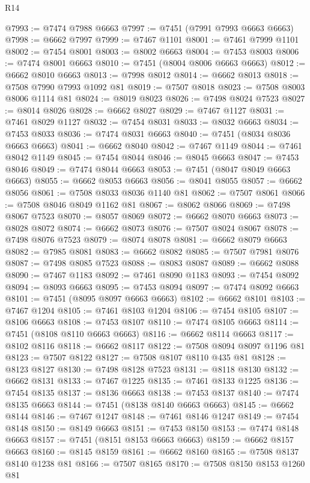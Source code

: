 \begin{lexlean}{R14}
\begin{coremodule}
@7993 := @7474 @7988 @6663
@7997 := @7451 (@7991 @7993 @6663 @6663)
@7998 := @6662 @7997
@7999 := @7467 @1101
@8001 := @7461 @7999 @1101
@8002 := @7454 @8001
@8003 := @8002 @6663
@8004 := @7453 @8003
@8006 := @7474 @8001 @6663
@8010 := @7451 (@8004 @8006 @6663 @6663)
@8012 := @6662 @8010 @6663
@8013 := @7998 @8012
@8014 := @6662 @8013
@8018 := @7508 @7990 @7993 @1092 @81
@8019 := @7507 @8018
@8023 := @7508 @8003 @8006 @1114 @81
@8024 := @8019 @8023
@8026 := @7498 @8024 @7523
@8027 := @8014 @8026
@8028 := @6662 @8027
@8029 := @7467 @1127
@8031 := @7461 @8029 @1127
@8032 := @7454 @8031
@8033 := @8032 @6663
@8034 := @7453 @8033
@8036 := @7474 @8031 @6663
@8040 := @7451 (@8034 @8036 @6663 @6663)
@8041 := @6662 @8040
@8042 := @7467 @1149
@8044 := @7461 @8042 @1149
@8045 := @7454 @8044
@8046 := @8045 @6663
@8047 := @7453 @8046
@8049 := @7474 @8044 @6663
@8053 := @7451 (@8047 @8049 @6663 @6663)
@8055 := @6662 @8053 @6663
@8056 := @8041 @8055
@8057 := @6662 @8056
@8061 := @7508 @8033 @8036 @1140 @81
@8062 := @7507 @8061
@8066 := @7508 @8046 @8049 @1162 @81
@8067 := @8062 @8066
@8069 := @7498 @8067 @7523
@8070 := @8057 @8069
@8072 := @6662 @8070 @6663
@8073 := @8028 @8072
@8074 := @6662 @8073
@8076 := @7507 @8024 @8067
@8078 := @7498 @8076 @7523
@8079 := @8074 @8078
@8081 := @6662 @8079 @6663
@8082 := @7985 @8081
@8083 := @6662 @8082
@8085 := @7507 @7981 @8076
@8087 := @7498 @8085 @7523
@8088 := @8083 @8087
@8089 := @6662 @8088
@8090 := @7467 @1183
@8092 := @7461 @8090 @1183
@8093 := @7454 @8092
@8094 := @8093 @6663
@8095 := @7453 @8094
@8097 := @7474 @8092 @6663
@8101 := @7451 (@8095 @8097 @6663 @6663)
@8102 := @6662 @8101
@8103 := @7467 @1204
@8105 := @7461 @8103 @1204
@8106 := @7454 @8105
@8107 := @8106 @6663
@8108 := @7453 @8107
@8110 := @7474 @8105 @6663
@8114 := @7451 (@8108 @8110 @6663 @6663)
@8116 := @6662 @8114 @6663
@8117 := @8102 @8116
@8118 := @6662 @8117
@8122 := @7508 @8094 @8097 @1196 @81
@8123 := @7507 @8122
@8127 := @7508 @8107 @8110 @435 @81
@8128 := @8123 @8127
@8130 := @7498 @8128 @7523
@8131 := @8118 @8130
@8132 := @6662 @8131
@8133 := @7467 @1225
@8135 := @7461 @8133 @1225
@8136 := @7454 @8135
@8137 := @8136 @6663
@8138 := @7453 @8137
@8140 := @7474 @8135 @6663
@8144 := @7451 (@8138 @8140 @6663 @6663)
@8145 := @6662 @8144
@8146 := @7467 @1247
@8148 := @7461 @8146 @1247
@8149 := @7454 @8148
@8150 := @8149 @6663
@8151 := @7453 @8150
@8153 := @7474 @8148 @6663
@8157 := @7451 (@8151 @8153 @6663 @6663)
@8159 := @6662 @8157 @6663
@8160 := @8145 @8159
@8161 := @6662 @8160
@8165 := @7508 @8137 @8140 @1238 @81
@8166 := @7507 @8165
@8170 := @7508 @8150 @8153 @1260 @81

\end{coremodule}
\end{lexlean}
